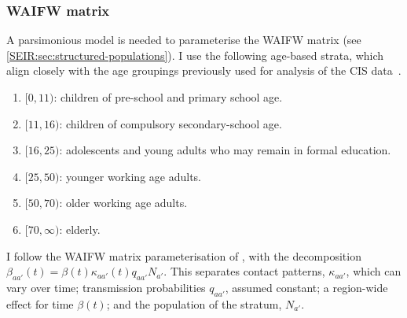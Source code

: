 \documentclass[thesis.tex]{subfiles}
\begin{document}
\subsubsection{WAIFW matrix}

A parsimonious model is needed to parameterise the WAIFW matrix (see \cref{SEIR:sec:structured-populations}).
I use the following age-based strata, which align closely with the age groupings previously used for analysis of the CIS data~\autocites[e.g.:][]{houseInferring}{walkerTracking}.
\begin{enumerate}
    \item $[0, 11)$: children of pre-school and primary school age.
    \item $[11, 16)$: children of compulsory secondary-school age.
    \item $[16, 25)$: adolescents and young adults who may remain in formal education.
    \item $[25, 50)$: younger working age adults.
    \item $[50, 70)$: older working age adults.
    \item $[70, \infty)$: elderly.
\end{enumerate}

I follow the WAIFW matrix parameterisation of \textcite{birrellRealtime}, with the decomposition $\beta_{aa'}(t) = \beta(t) \kappa_{aa'}(t) q_{aa'} N_{a'}$.
This separates contact patterns, $\kappa_{aa'}$, which can vary over time; transmission probabilities $q_{aa'}$, assumed constant; a region-wide effect for time $\beta(t)$; and the population of the stratum, $N_{a'}$.
\end{document}
